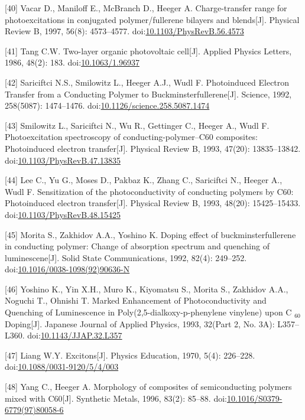 \documentclass[12pt,]{report}
\begin{document}
{[}40{]} Vacar D., Maniloff E., McBranch D., Heeger A. Charge-transfer
range for photoexcitations in conjugated polymer/fullerene bilayers and
blends{[}J{]}. Physical Review B, 1997, 56(8): 4573--4577.
doi:\href{http://dx.doi.org/10.1103/PhysRevB.56.4573}{10.1103/PhysRevB.56.4573}

{[}41{]} Tang C.W. Two-layer organic photovoltaic cell{[}J{]}. Applied
Physics Letters, 1986, 48(2): 183.
doi:\href{http://dx.doi.org/10.1063/1.96937}{10.1063/1.96937}

{[}42{]} Sariciftci N.S., Smilowitz L., Heeger A.J., Wudl F.
Photoinduced Electron Transfer from a Conducting Polymer to
Buckminsterfullerene{[}J{]}. Science, 1992, 258(5087): 1474--1476.
doi:\href{http://dx.doi.org/10.1126/science.258.5087.1474}{10.1126/science.258.5087.1474}

{[}43{]} Smilowitz L., Sariciftci N., Wu R., Gettinger C., Heeger A.,
Wudl F. Photoexcitation spectroscopy of conducting-polymer--C60
composites: Photoinduced electron transfer{[}J{]}. Physical Review B,
1993, 47(20): 13835--13842.
doi:\href{http://dx.doi.org/10.1103/PhysRevB.47.13835}{10.1103/PhysRevB.47.13835}

{[}44{]} Lee C., Yu G., Moses D., Pakbaz K., Zhang C., Sariciftci N.,
Heeger A., Wudl F. Sensitization of the photoconductivity of conducting
polymers by C60: Photoinduced electron transfer{[}J{]}. Physical Review
B, 1993, 48(20): 15425--15433.
doi:\href{http://dx.doi.org/10.1103/PhysRevB.48.15425}{10.1103/PhysRevB.48.15425}

{[}45{]} Morita S., Zakhidov A.A., Yoshino K. Doping effect of
buckminsterfullerene in conducting polymer: Change of absorption
spectrum and quenching of luminescene{[}J{]}. Solid State
Communications, 1992, 82(4): 249--252.
doi:\href{http://dx.doi.org/10.1016/0038-1098(92)90636-N}{10.1016/0038-1098(92)90636-N}

{[}46{]} Yoshino K., Yin X.H., Muro K., Kiyomatsu S., Morita S.,
Zakhidov A.A., Noguchi T., Ohnishi T. Marked Enhancement of
Photoconductivity and Quenching of Luminescence in
Poly(2,5-dialkoxy-p-phenylene vinylene) upon C \(_{\textrm{60}}\)
Doping{[}J{]}. Japanese Journal of Applied Physics, 1993, 32(Part 2, No.
3A): L357--L360.
doi:\href{http://dx.doi.org/10.1143/JJAP.32.L357}{10.1143/JJAP.32.L357}

{[}47{]} Liang W.Y. Excitons{[}J{]}. Physics Education, 1970, 5(4):
226--228.
doi:\href{http://dx.doi.org/10.1088/0031-9120/5/4/003}{10.1088/0031-9120/5/4/003}

{[}48{]} Yang C., Heeger A. Morphology of composites of semiconducting
polymers mixed with C60{[}J{]}. Synthetic Metals, 1996, 83(2): 85--88.
doi:\href{http://dx.doi.org/10.1016/S0379-6779(97)80058-6}{10.1016/S0379-6779(97)80058-6}
\end{document}
